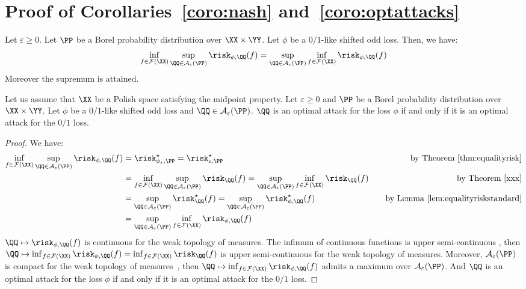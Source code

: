 \section{Proof of Corollaries~\ref{coro:nash} and~\ref{coro:optattacks}}
\begin{coro*} 
Let $\varepsilon\geq 0$. Let $\PP$ be a Borel probability distribution over $\XX\times\YY$. Let ${\phi}$ be a $0/1$-like shifted odd loss. Then, we have:
\begin{align*}
    \inf_{f\in\mathcal{F}(\XX)}\sup_{\QQ\in\mathcal{A}_\varepsilon(\PP)} \risk_{\phi,\QQ}(f) =    \sup_{\QQ\in\mathcal{A}_\varepsilon(\PP)} \inf_{f\in\mathcal{F}(\XX)} \risk_{\phi,\QQ}(f)
\end{align*}
Moreover the supremum is attained.
\end{coro*}
\begin{coro*}
Let us assume that $\XX$ be a Polish space satisfying the midpoint property. Let $\varepsilon\geq 0$ and $\PP$ be a Borel probability distribution over $\XX\times\YY$. Let ${\phi}$ be a $0/1$-like shifted odd loss and $\QQ\in\mathcal{A}_\varepsilon(\PP)$.  $\QQ$ is an optimal attack for the loss $\phi$  if and only if it is an optimal attack for the $0/1$ loss.
\end{coro*}


\begin{proof}
We have:
\begin{align*}
     \inf_{f\in\mathcal{F}(\XX)}\sup_{\QQ\in\mathcal{A}_\varepsilon(\PP)} \risk_{\phi,\QQ}(f) &= \risk_{\phi_\varepsilon,\PP}^\star = \risk_{\varepsilon,\PP}^\star&\quad\text{by Theorem~\ref{thm:equalityrisk}} \\
     &=\inf_{f\in\mathcal{F}(\XX)}\sup_{\QQ\in\mathcal{A}_\varepsilon(\PP)} \risk_{\QQ}(f) = \sup_{\QQ\in\mathcal{A}_\varepsilon(\PP)} \inf_{f\in\mathcal{F}(\XX)}\risk_{\QQ}(f)&\quad\text{by Theorem~\ref{xxx}}\\
     &=\sup_{\QQ\in\mathcal{A}_\varepsilon(\PP)} \risk^\star_{\QQ}(f) = \sup_{\QQ\in\mathcal{A}_\varepsilon(\PP)} \risk^\star_{\phi,\QQ}(f)&\quad\text{by Lemma~\ref{lem:equalityriskstandard}}\\
    & =  \sup_{\QQ\in\mathcal{A}_\varepsilon(\PP)}\inf_{f\in\mathcal{F}(\XX)} \risk_{\phi,\QQ}(f)\\
\end{align*}
$\QQ\mapsto\risk_{\phi,\QQ}(f)$ is continuous for the weak topology of measures. The infimum of continuous functions is upper semi-continuous , then  $\QQ\mapsto\inf_{f\in\mathcal{F}(\XX)}\risk_{\phi,\QQ}(f) =\inf_{f\in\mathcal{F}(\XX)}\risk_{\QQ}(f)  $ is  upper semi-continuous for the weak topology of measures. Moreover, $\mathcal{A}_\varepsilon(\PP)$ is compact for the weak topology of measures~\citep{meunier2021mixed}, then $\QQ\mapsto\inf_{f\in\mathcal{F}(\XX)}\risk_{\phi,\QQ}(f)$ admits a maximum over  $\mathcal{A}_\varepsilon(\PP)$. And  $\QQ$ is an optimal attack for the loss $\phi$  if and only if it is an optimal attack for the $0/1$ loss.
\end{proof}

